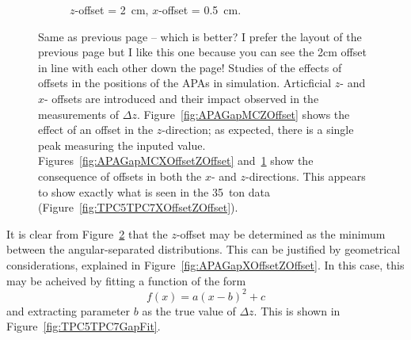 \begin{figure}
\begin{subfigure}[t]{\linewidth}
    \caption{$z$-offset = 2~cm, $x$-offset = 0.5~cm.}
    \label{fig:APAGapMCXOffsetZOffsetAngle}
  \end{subfigure}
  \caption{{\color{red} Same as previous page -- which is better?  I prefer the layout of the previous page but I like this one because you can see the 2cm offset in line with each other down the page!}  Studies of the effects of offsets in the positions of the APAs in simulation.  Articficial $z$- and $x$- offsets are introduced and their impact observed in the measurements of $\Delta z$.  Figure~\ref{fig:APAGapMCZOffset} shows the effect of an offset in the $z$-direction; as expected, there is a single peak measuring the inputed value.  Figures~\ref{fig:APAGapMCXOffsetZOffset} and~\ref{fig:APAGapMCXOffsetZOffsetAngle} show the consequence of offsets in both the $x$- and $z$-directions.  This appears to show exactly what is seen in the 35~ton data (Figure~\ref{fig:TPC5TPC7XOffsetZOffset}).}
  \label{fig:APAGapMC}
\end{figure}

It is clear from Figure~\ref{fig:APAGapMC} that the $z$-offset may be determined as the minimum between the angular-separated distributions.  This can be justified by geometrical considerations, explained in Figure~\ref{fig:APAGapXOffsetZOffset}.  In this case, this may be acheived by fitting a function of the form
\begin{equation}
  f(x) = a(x-b)^2+c
\end{equation}
and extracting parameter $b$ as the true value of $\Delta z$.  This is shown in Figure~\ref{fig:TPC5TPC7GapFit}.

